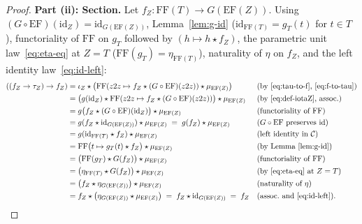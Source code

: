 \documentclass[11pt,a4paper]{article}
\theoremstyle{definition}
\theoremstyle{remark}
\newcommand{\id}{\mathrm{id}}
\newcommand{\FF}{\mathrm{FF}}
\newcommand{\EF}{\mathrm{EF}}
\newcommand{\iotaZ}{\iota_Z}
\begin{document}
\begin{proof}
\textbf{Part (ii): Section.}
Let $f_Z : \FF(T) \to G(\EF(Z))$. Using $(G\circ\EF)(\id_Z) = \id_{G(\EF(Z))}$, Lemma~\ref{lem:g-id}
($\id_{\FF(T)} = g_T(t)$ for $t \in T$), functoriality of $\FF$ on $g_T$ followed by
$(h \mapsto h \star f_Z)$, the parametric unit law~\eqref{eq:eta-eq} at $Z = T$
($\FF(g_T) = \eta_{\FF(T)}$), naturality of $\eta$ on $f_Z$, and the left identity
law~\eqref{eq:id-left}:
\begin{align*}
  ((f_Z \to \tau_Z) \to f_Z)
  &= \iotaZ \star \bigl(\FF(z2z \mapsto f_Z \star (G\circ\EF)(z2z)) \star \mu_{\EF(Z)}\bigr)
    &&\text{(by \eqref{eq:tau-to-f}, \eqref{eq:f-to-tau})} \\
  &= \bigl(g(\id_Z) \star \FF(z2z \mapsto f_Z \star (G\circ\EF)(z2z))\bigr) \star \mu_{\EF(Z)}
    &&\text{(by \eqref{eq:def-iotaZ}, assoc.)} \\
  &= g\bigl(f_Z \star (G\circ\EF)(\id_Z)\bigr) \star \mu_{\EF(Z)}
    &&\text{(functoriality of $\FF$)} \\
  &= g(f_Z \star \id_{G(\EF(Z))}) \star \mu_{\EF(Z)} \;=\; g(f_Z) \star \mu_{\EF(Z)}
    &&\text{($G \circ \EF$ preserves $\id$)} \\
  &= g(\id_{\FF(T)} \star f_Z) \star \mu_{\EF(Z)}
    &&\text{(left identity in $\mathcal{C}$)} \\
  &= \FF\bigl(t \mapsto g_T(t) \star f_Z\bigr) \star \mu_{\EF(Z)}
    &&\text{(by Lemma~\ref{lem:g-id})} \\
  &= \bigl(\FF(g_T) \star G(f_Z)\bigr) \star \mu_{\EF(Z)}
    &&\text{(functoriality of $\FF$)} \\
  &= \bigl(\eta_{\FF(T)} \star G(f_Z)\bigr) \star \mu_{\EF(Z)}
    &&\text{(by \eqref{eq:eta-eq} at $Z = T$)} \\
  &= \bigl(f_Z \star \eta_{G(\EF(Z))}\bigr) \star \mu_{\EF(Z)}
    &&\text{(naturality of $\eta$)} \\
  &= f_Z \star \bigl(\eta_{G(\EF(Z))} \star \mu_{\EF(Z)}\bigr)
   \;=\; f_Z \star \id_{G(\EF(Z))} \;=\; f_Z
    &&\text{(assoc.\ and \eqref{eq:id-left})}.
\end{align*}


\end{proof}
\end{document}
